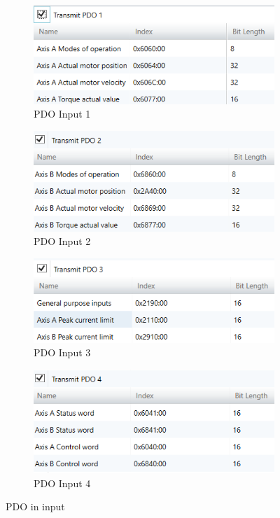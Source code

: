 \begin{figure}[!ht]
\begin{subfigure}{.5\textwidth}
  \centering
  \includegraphics[width=.7\linewidth]{Immagini/Sperimentale/pdo1in.png}  
  \caption{PDO Input 1}
  \label{fig:sub-firstpdo}
\end{subfigure}
\begin{subfigure}{.5\textwidth}
  \centering
  \includegraphics[width=.7\linewidth]{Immagini/Sperimentale/pdo2in.png}  
  \caption{PDO Input 2}
  \label{fig:sub-secondpdo}
\end{subfigure}
\begin{subfigure}{.5\textwidth}
  \centering
  \includegraphics[width=.7\linewidth]{Immagini/Sperimentale/pdo3in.png}  
  \caption{PDO Input 3}
  \label{fig:sub-thirdpdo}
\end{subfigure}
\begin{subfigure}{.5\textwidth}
  \centering
  \includegraphics[width=.7\linewidth]{Immagini/Sperimentale/pdo4in.png}  
  \caption{PDO Input 4}
  \label{fig:sub-fourthpdo}
\end{subfigure}
\caption{PDO in input}
\label{fig:PDOIn}
\end{figure}
